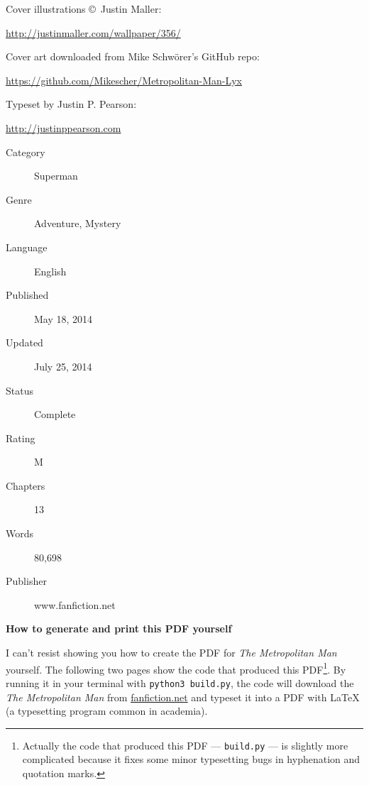 \documentclass[ebook,12pt]{memoir}
\begin{document}
\vspace{.2in}

\noindent Cover illustrations \copyright\ Justin Maller:

\url{http://justinmaller.com/wallpaper/356/}

\vspace{.2in}

\noindent Cover art downloaded from Mike Schw\"orer's GitHub repo:

\url{https://github.com/Mikescher/Metropolitan-Man-Lyx}

\vspace{.2in}

\noindent Typeset by Justin P. Pearson:

\url{http://justinppearson.com}


\vfill

\begin{description}
    \item[Category] Superman
    \item[Genre] Adventure, Mystery 
    \item[Language] English 
    \item[Published] May 18, 2014
    \item[Updated] July 25, 2014
    \item[Status] Complete
    \item[Rating] M 
    \item[Chapters] 13 
    \item[Words] 80,698
    \item[Publisher] www.fanfiction.net 
\end{description}

\normalsize
\cleartorecto


\thispagestyle{empty}

\vspace*{2in}

\textbf{How to generate and print this PDF yourself}

\vspace*{.5cm}

\footnotesize

I can't resist showing you how to create the PDF for \emph{The Metropolitan Man} yourself. 
The following two pages show the code that produced this 
PDF\footnote{ \tiny{Actually the code that produced this PDF --- \texttt{build.py} --- is slightly more complicated
because it fixes some minor typesetting bugs in hyphenation and quotation marks.}}. 
By running it in your terminal with \texttt{python3 build.py}, the code will
download the \emph{The Metropolitan Man} from \url{fanfiction.net} 
and typeset it into a PDF with LaTeX (a typesetting program common in academia).
\end{document}

